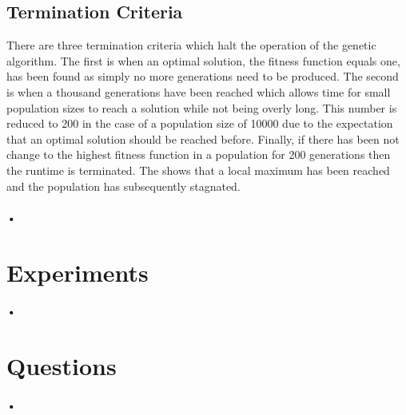 \documentclass[10pt]{article}
\begin{document}
\subsection{Termination Criteria}
There are three termination criteria which halt the operation of the genetic algorithm. The first is when an optimal solution, the fitness function equals one, has been found as simply no more generations need to be produced. The second is when a thousand generations have been reached which allows time for small population sizes to reach a solution while not being overly long. This number is reduced to 200 in the case of a population size of 10000 due to the expectation that an optimal solution should be reached before. Finally, if there has been not change to the highest fitness function in a population for 200 generations then the runtime is terminated. The shows that a local maximum has been reached and the population has subsequently stagnated.
\paragraph{•}
\section{Experiments}
\paragraph{•}
\section{Questions}
\paragraph{•}
\end{document}

